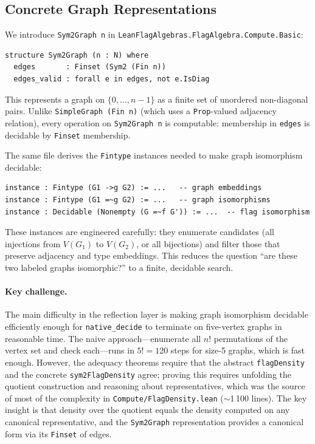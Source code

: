 \documentclass{article}
\newcommand{\lean}[1]{\texttt{#1}}
\begin{document}
\subsection{Concrete Graph Representations}

We introduce \lean{Sym2Graph n} in
\lean{LeanFlagAlgebras.FlagAlgebra.Compute.Basic}:
\begin{lstlisting}
structure Sym2Graph (n : N) where
  edges       : Finset (Sym2 (Fin n))
  edges_valid : forall e in edges, not e.IsDiag
\end{lstlisting}
This represents a graph on $\{0,\ldots,n-1\}$ as a finite set of unordered
non-diagonal pairs.  Unlike \lean{SimpleGraph (Fin n)} (which uses a
\lean{Prop}-valued adjacency relation), every operation on \lean{Sym2Graph n}
is computable: membership in \lean{edges} is decidable by \lean{Finset}
membership.

The same file derives the \lean{Fintype} instances needed to make graph
isomorphism decidable:
\begin{lstlisting}
instance : Fintype (G1 ->g G2) := ...   -- graph embeddings
instance : Fintype (G1 =~g G2) := ...   -- graph isomorphisms
instance : Decidable (Nonempty (G =~f G')) := ...  -- flag isomorphism
\end{lstlisting}
These instances are engineered carefully: they enumerate candidates (all
injections from $V(G_1)$ to $V(G_2)$, or all bijections) and filter those
that preserve adjacency and type embeddings.  This reduces the question ``are
these two labeled graphs isomorphic?'' to a finite, decidable search.

\paragraph{Key challenge.}
The main difficulty in the reflection layer is making graph isomorphism
decidable efficiently enough for \lean{native\_decide} to terminate on
five-vertex graphs in reasonable time.  The naive approach---enumerate all
$n!$ permutations of the vertex set and check each---runs in $5! = 120$
steps for size-5 graphs, which is fast enough.  However, the adequacy
theorems require that the abstract \lean{flagDensity} and the concrete
\lean{sym2FlagDensity} agree; proving this requires unfolding the quotient
construction and reasoning about representatives, which was the source of most
of the complexity in \lean{Compute/FlagDensity.lean} ($\sim$1\,100 lines).
The key insight is that density over the quotient equals the density computed
on any canonical representative, and the \lean{Sym2Graph} representation
provides a canonical form via its \lean{Finset} of edges.
\end{document}
